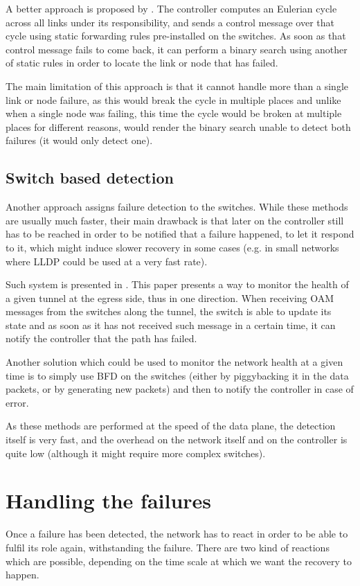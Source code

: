 \documentclass[compsoc]{IEEEtran}
\begin{document}
A better approach is proposed by \cite{2013arXiv1308.4465K}. The controller computes an Eulerian cycle across all links under its responsibility, and sends a control message over that cycle using static forwarding rules pre-installed on the switches. As soon as that control message fails to come back, it can perform a binary search using another of static rules in order to locate the link or node that has failed.

The main limitation of this approach is that it cannot handle more than a single link or node failure, as this would break the cycle in multiple places and unlike when a single node was failing, this time the cycle would be broken at multiple places for different reasons, would render the binary search unable to detect both failures (it would only detect one).

\subsection{Switch based detection}
Another approach assigns failure detection to the switches. While these methods are usually much faster, their main drawback is that later on the controller still has to be reached in order to be notified that a failure happened, to let it respond to it, which might induce slower recovery in some cases (e.g. in small networks where LLDP could be used at a very fast rate).

Such system is presented in \cite{6364688}. This paper presents a way to monitor the health of a given tunnel at the egress side, thus in one direction. When receiving OAM messages from the switches along the tunnel, the switch is able to update its state and as soon as it has not received such message in a certain time, it can notify the controller that the path has failed.

Another solution which could be used to monitor the network health at a given time is to simply use BFD on the switches (either by piggybacking it in the data packets, or by generating new packets) and then to notify the controller in case of error.

As these methods are performed at the speed of the data plane, the detection itself is very fast, and the overhead on the network itself and on the controller is quite low (although it might require more complex switches).

\section{Handling the failures}
Once a failure has been detected, the network has to react in order to be able to fulfil its role again, withstanding the failure. There are two kind of reactions which are possible, depending on the time scale at which we want the recovery to happen.
\end{document}
